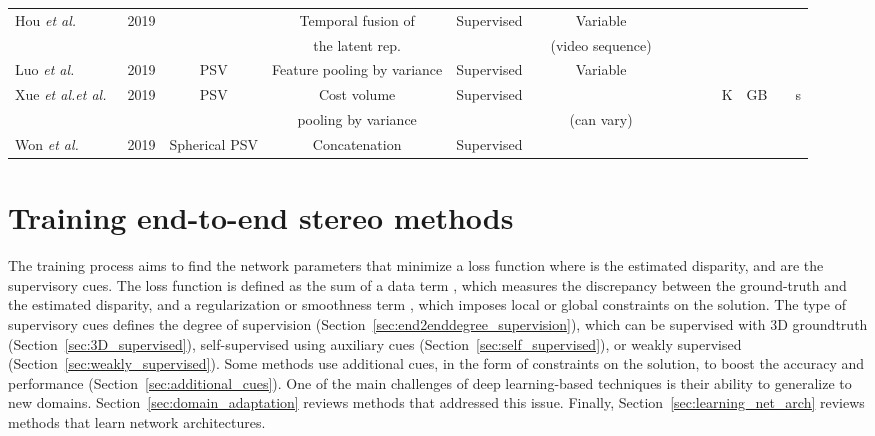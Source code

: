 \documentclass[10pt,journal,compsoc]{IEEEtran}
\newcommand{\etal}{\emph{et al.}}
\begin{document}
\begin{table*}
{\begin{tabular}{@{}l@{ }l @{ }c@{ }c @{ }c   @{ }c   @{ }c@{ }c@{ }c@{ }c@{ }c @{ }c@{ }c@{ }c@{ }c@{}}
	Hou \etal~\cite{Hou_2019_ICCV}& 2019 & &  Temporal fusion of &Supervised & & Variable  &     &  & & &  &  &  &   \\
								     & &  & the latent rep. &  & & (video sequence)\\
	\hline
Luo \etal~\cite{Luo_2019_ICCV}& 2019 & PSV & Feature pooling by variance& Supervised& & Variable &    &  &  &  &  &  &  &  \\  \hline
Xue \etal\etal~\cite{Xue_2019_ICCV}& 2019 &  PSV& Cost volume& Supervised & &  &     &   &  & & K  & GB &  & s\\  & & &  pooling by variance& & & (can vary) & \\
	\hline
 Won \etal~\cite{Won_2019_ICCV}& 2019 & Spherical PSV& Concatenation &Supervised & & &  &  &  & &  &  &  & \\
	
	\bottomrule
	\end{tabular}
	}
\end{table*}



\section{Training end-to-end stereo methods}
\label{sec:training_end_to_end}

The training process aims to find the network parameters    that minimize a loss function  where   is the estimated disparity, and    are the supervisory cues.  The loss function is  defined as the sum of a data term , which measures the discrepancy between  the ground-truth and the estimated disparity, and a regularization or smoothness term , which imposes  local or global constraints on the solution. The type of supervisory cues   defines the degree of supervision  (Section~\ref{sec:end2enddegree_supervision}), which can be  supervised with 3D groundtruth (Section~\ref{sec:3D_supervised}), self-supervised using auxiliary cues (Section~\ref{sec:self_supervised}), or weakly supervised (Section~\ref{sec:weakly_supervised}). Some methods  use additional cues, in the form of constraints on the solution, to boost the accuracy and performance (Section~\ref{sec:additional_cues}). One of the main challenges of deep learning-based techniques is their ability to generalize to new domains.  Section~\ref{sec:domain_adaptation} reviews methods that addressed this issue. Finally, Section~\ref{sec:learning_net_arch} reviews methods that learn network architectures.
\end{document}
